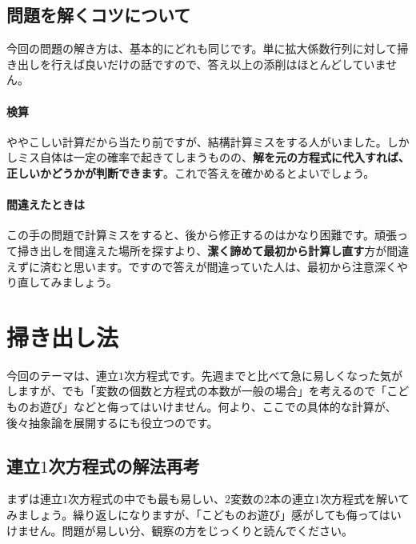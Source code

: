 \subsection{問題を解くコツについて}

今回の問題の解き方は、基本的にどれも同じです。単に拡大係数行列に対して掃き出しを行えば良いだけの話ですので、答え以上の添削はほとんどしていません。

\paragraph{検算}

ややこしい計算だから当たり前ですが、結構計算ミスをする人がいました。しかしミス自体は一定の確率で起きてしまうものの、\textbf{解を元の方程式に代入すれば、正しいかどうかが判断できます}。これで答えを確かめるとよいでしょう。

\paragraph{間違えたときは}

この手の問題で計算ミスをすると、後から修正するのはかなり困難です。頑張って掃き出しを間違えた場所を探すより、\textbf{潔く諦めて最初から計算し直す}方が間違えずに済むと思います。ですので答えが間違っていた人は、最初から注意深くやり直してみましょう。

\section{掃き出し法}

今回のテーマは、連立$1$次方程式です。先週までと比べて急に易しくなった気がしますが、でも「変数の個数と方程式の本数が一般の場合」を考えるので「こどものお遊び」などと侮ってはいけません。何より、ここでの具体的な計算が、後々抽象論を展開するにも役立つのです。

\subsection{連立$1$次方程式の解法再考}

まずは連立$1$次方程式の中でも最も易しい、$2$変数の$2$本の連立$1$次方程式を解いてみましょう。繰り返しになりますが、「こどものお遊び」感がしても侮ってはいけません。問題が易しい分、観察の方をじっくりと読んでください。

